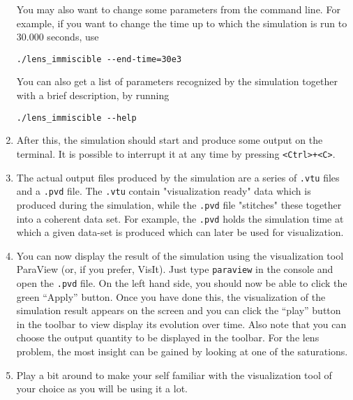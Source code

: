 \begin{enumerate}
You may also want to change some parameters from the command line. For
example, if you want to change the time up to which the simulation is
run to $30.000$ seconds, use
\begin{lstlisting}[style=Bash]
./lens_immiscible --end-time=30e3
\end{lstlisting}

You can also get a list of parameters recognized by the
simulation together with a brief description, by running
\begin{lstlisting}[style=Bash]
./lens_immiscible --help
\end{lstlisting}

\item After this, the simulation should start and produce some output
  on the terminal. It is possible to interrupt it at any time by
  pressing \texttt{<Ctrl>+<C>}.

\item The actual output files produced by the simulation are a series
  of \texttt{.vtu} files and a \texttt{.pvd} file. The \texttt{.vtu}
  contain "visualization ready" data which is produced during the
  simulation, while the \texttt{.pvd} file "stitches" these together
  into a coherent data set. For example, the \texttt{.pvd} holds the
  simulation time at which a given data-set is produced which can
  later be used for visualization.
\item You can now display the result of the simulation using the
  visualization tool ParaView (or, if you prefer, VisIt). Just type
  \texttt{paraview} in the console and open the \texttt{.pvd} file. On
  the left hand side, you should now be able to click the green
  ``Apply'' button. Once you have done this, the visualization of the
  simulation result appears on the screen and you can click the
  ``play'' button in the toolbar to view display its evolution over
  time.  Also note that you can choose the output quantity to be
  displayed in the toolbar. For the lens problem, the most insight can
  be gained by looking at one of the saturations.
\item Play a bit around to make your self familiar with the
  visualization tool of your choice as you will be using it a lot.
\end{enumerate}

